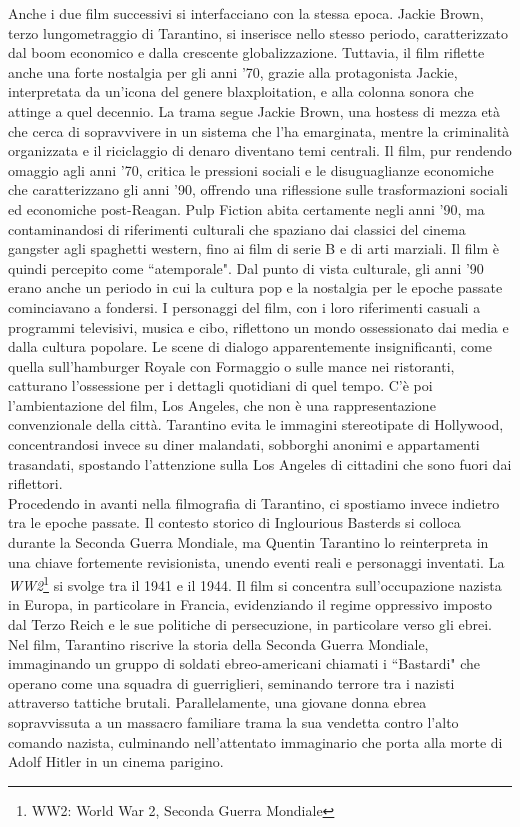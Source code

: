 \documentclass[12pt]{article} %
\begin{document}
\begin{flushleft}
    Anche i due film successivi si interfacciano con la stessa epoca. Jackie Brown, terzo lungometraggio di Tarantino, si inserisce nello stesso periodo, caratterizzato dal boom economico e dalla crescente globalizzazione. Tuttavia, il film riflette anche una forte nostalgia per gli anni '70, grazie alla protagonista Jackie, interpretata da un'icona del genere blaxploitation, e alla colonna sonora che attinge a quel decennio. La trama segue Jackie Brown, una hostess di mezza età che cerca di sopravvivere in un sistema che l'ha emarginata, mentre la criminalità organizzata e il riciclaggio di denaro diventano temi centrali. Il film, pur rendendo omaggio agli anni '70, critica le pressioni sociali e le disuguaglianze economiche che caratterizzano gli anni '90, offrendo una riflessione sulle trasformazioni sociali ed economiche post-Reagan.
    Pulp Fiction abita certamente negli anni '90, ma contaminandosi di riferimenti culturali che spaziano dai classici del cinema gangster agli spaghetti western, fino ai film di serie B e di arti marziali. Il film è quindi percepito come ``atemporale". Dal punto di vista culturale, gli anni '90 erano anche un periodo in cui la cultura pop e la nostalgia per le epoche passate cominciavano a fondersi. 
    I personaggi del film, con i loro riferimenti casuali a programmi televisivi, musica e cibo, riflettono un mondo ossessionato dai media e dalla cultura popolare. Le scene di dialogo apparentemente insignificanti, come quella sull’hamburger Royale con Formaggio o sulle mance nei ristoranti, catturano l’ossessione per i dettagli quotidiani di quel tempo. C'è poi l'ambientazione del film, Los Angeles, che non è una rappresentazione convenzionale della città. Tarantino evita le immagini stereotipate di Hollywood, concentrandosi invece su diner malandati, sobborghi anonimi e appartamenti trasandati, spostando l'attenzione sulla Los Angeles di cittadini che sono fuori dai riflettori.
    \\\vspace{1cm}
    Procedendo in avanti nella filmografia di Tarantino, ci spostiamo invece indietro tra le epoche passate. Il contesto storico di Inglourious Basterds si colloca durante la Seconda Guerra Mondiale, ma Quentin Tarantino lo reinterpreta in una chiave fortemente revisionista, unendo eventi reali e personaggi inventati. La \textit{WW2}\footnote{WW2: World War 2, Seconda Guerra Mondiale} si svolge tra il 1941 e il 1944. Il film si concentra sull’occupazione nazista in Europa, in particolare in Francia, evidenziando il regime oppressivo imposto dal Terzo Reich e le sue politiche di persecuzione, in particolare verso gli ebrei. Nel film, Tarantino riscrive la storia della Seconda Guerra Mondiale, immaginando un gruppo di soldati ebreo-americani chiamati i ``Bastardi" che operano come una squadra di guerriglieri, seminando terrore tra i nazisti attraverso tattiche brutali. Parallelamente, una giovane donna ebrea sopravvissuta a un massacro familiare trama la sua vendetta contro l’alto comando nazista, culminando nell’attentato immaginario che porta alla morte di Adolf Hitler in un cinema parigino.

\end{flushleft}
\end{document}
